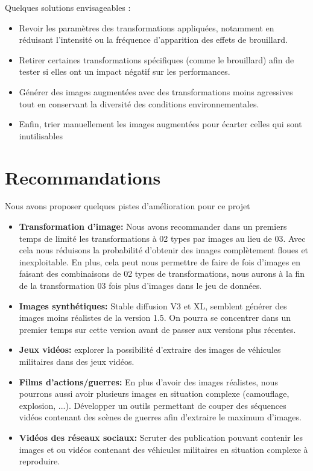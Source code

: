 \noindent Quelques solutions envisageables :

\begin{itemize}
    \item Revoir les paramètres des transformations appliquées, notamment en réduisant l’intensité ou la fréquence d’apparition des effets de brouillard.
    \item Retirer certaines transformations spécifiques (comme le brouillard) afin de tester si elles ont un impact négatif sur les performances.
    \item Générer des images augmentées avec des transformations moins agressives tout en conservant la diversité des conditions environnementales.
    \item Enfin, trier manuellement les images augmentées pour écarter celles qui sont inutilisables
\end{itemize}



\section{Recommandations}
Nous avons proposer quelques pistes d'amélioration pour ce projet

\begin{itemize}
    \item \textbf{Transformation d'image:} Nous avons recommander dans un premiers temps de limité les transformations à 02 types par images au lieu de 03. Avec cela nous réduisons la probabilité d'obtenir des images complètement floues et inexploitable. En plus, cela peut nous permettre de faire de fois d'images en faisant des combinaisons de 02 types de transformations, nous aurons à la fin de la transformation 03 fois plus d'images dans le jeu de données.
    \item \textbf{Images synthétiques:} Stable diffusion V3 et XL, semblent générer des images moins réalistes de la version 1.5. On pourra se concentrer dans un premier temps sur cette version avant de passer aux versions plus récentes.
    \item \textbf{Jeux vidéos:} explorer la possibilité d'extraire des images de véhicules militaires dans des jeux vidéos.
    \item \textbf{Films d'actions/guerres: } En plus d'avoir des images réalistes, nous pourrons aussi avoir plusieurs images en situation complexe (camouflage, explosion, ...). Développer un outils permettant de couper des séquences vidéos contenant des scènes de guerres afin d'extraire le maximum d'images.
    \item \textbf{Vidéos des réseaux sociaux: } Scruter des publication pouvant contenir les images et ou vidéos contenant des véhicules militaires en situation complexe à reproduire.
\end{itemize}

